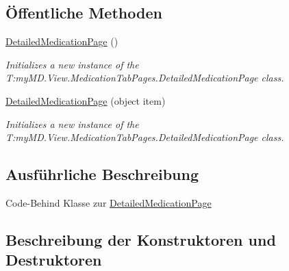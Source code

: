 \subsection*{Öffentliche Methoden}
\begin{DoxyCompactItemize}
\item 
\mbox{\hyperlink{classmy_m_d_1_1_view_1_1_medication_tab_pages_1_1_detailed_medication_page_ad79a81b82b91b290f8e80534849eab79}{Detailed\+Medication\+Page}} ()
\begin{DoxyCompactList}\small\item\em Initializes a new instance of the T\+:my\+M\+D.\+View.\+Medication\+Tab\+Pages.\+Detailed\+Medication\+Page class. \end{DoxyCompactList}\item 
\mbox{\hyperlink{classmy_m_d_1_1_view_1_1_medication_tab_pages_1_1_detailed_medication_page_a85fb3c6227ab81ef9b263263d76726b9}{Detailed\+Medication\+Page}} (object item)
\begin{DoxyCompactList}\small\item\em Initializes a new instance of the T\+:my\+M\+D.\+View.\+Medication\+Tab\+Pages.\+Detailed\+Medication\+Page class. \end{DoxyCompactList}\end{DoxyCompactItemize}


\subsection{Ausführliche Beschreibung}
Code-\/\+Behind Klasse zur \mbox{\hyperlink{classmy_m_d_1_1_view_1_1_medication_tab_pages_1_1_detailed_medication_page}{Detailed\+Medication\+Page}} 



\subsection{Beschreibung der Konstruktoren und Destruktoren}
\mbox{\label{classmy_m_d_1_1_view_1_1_medication_tab_pages_1_1_detailed_medication_page_ad79a81b82b91b290f8e80534849eab79}} 
